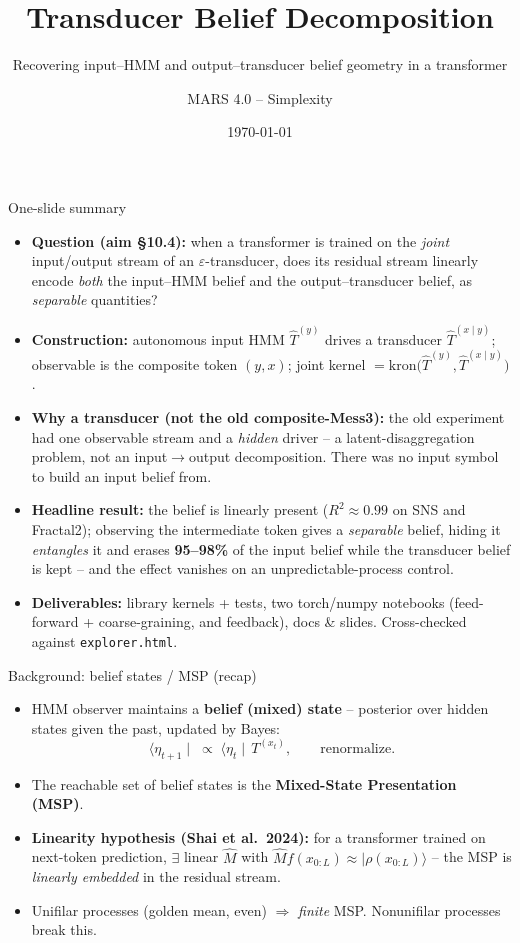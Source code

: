 \documentclass[aspectratio=169]{beamer}
\title[Transducer Belief Decomposition]{Transducer Belief Decomposition}
\subtitle{Recovering input--HMM and output--transducer belief geometry in a transformer}
\author{MARS 4.0 -- Simplexity}
\date{\today}
\newcommand{\Tin}{\hat{T}^{(y)}}
\newcommand{\Ttr}{\hat{T}^{(x\mid y)}}
\begin{document}
\begin{frame}\titlepage\end{frame}

\begin{frame}{One-slide summary}
\begin{itemize}
  \item \textbf{Question (aim §10.4):} when a transformer is trained on the \emph{joint}
        input/output stream of an $\varepsilon$-transducer, does its residual stream linearly
        encode \emph{both} the input--HMM belief and the output--transducer belief, as
        \emph{separable} quantities?
  \item \textbf{Construction:} autonomous input HMM $\Tin$ drives a transducer $\Ttr$; observable
        is the composite token $(y,x)$; joint kernel $=\mathrm{kron}\!\big(\Tin,\Ttr\big)$.
  \item \textbf{Why a transducer (not the old composite-Mess3):} the old experiment had one
        observable stream and a \emph{hidden} driver -- a latent-disaggregation problem, not an
        input$\to$output decomposition. There was no input symbol to build an input belief from.
  \item \textbf{Headline result:} the belief is linearly present ($R^2\approx0.99$ on SNS and
        Fractal2); observing the intermediate token gives a \emph{separable} belief, hiding it
        \emph{entangles} it and erases \textbf{95--98\%} of the input belief while the transducer
        belief is kept -- and the effect vanishes on an unpredictable-process control.
  \item \textbf{Deliverables:} library kernels + tests, two torch/numpy notebooks (feed-forward +
        coarse-graining, and feedback), docs \& slides. Cross-checked against \texttt{explorer.html}.
\end{itemize}
\end{frame}

\begin{frame}{Background: belief states / MSP (recap)}
\begin{itemize}
  \item HMM observer maintains a \textbf{belief (mixed) state} -- posterior over hidden states
        given the past, updated by Bayes:
        \[
          \langle\eta_{t+1}\mid\; \propto\; \langle\eta_t\mid\, T^{(x_t)},
          \qquad \text{renormalize}.
        \]
  \item The reachable set of belief states is the \textbf{Mixed-State Presentation (MSP)}.
  \item \textbf{Linearity hypothesis (Shai et al.\ 2024):} for a transformer trained on
        next-token prediction, $\exists$ linear $\hat M$ with
        $\hat M f(x_{0:L}) \approx \lvert\rho(x_{0:L})\rangle$ -- the MSP is \emph{linearly
        embedded} in the residual stream.
  \item Unifilar processes (golden mean, even) $\Rightarrow$ \emph{finite} MSP. Nonunifilar
        processes break this.
\end{itemize}
\end{frame}
\end{document}

